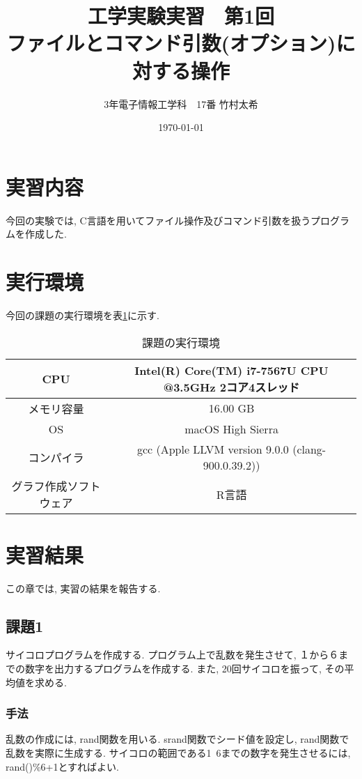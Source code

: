 \documentclass{jsarticle}
\title{工学実験実習　第1回\\ファイルとコマンド引数(オプション)に対する操作}
\author{3年電子情報工学科　17番 竹村太希}
\date{\today}
\begin{document}
    \maketitle
    \newpage{}

    \section{実習内容}
        今回の実験では, C言語を用いてファイル操作及びコマンド引数を扱うプログラムを作成した. 　　

    \section{実行環境}
        今回の課題の実行環境を表\ref{t-1}に示す. 
        \begin{table}[htbp]
            \centering
            \caption{課題の実行環境}
            \label{t-1}
            \begin{tabular}{|c||c|}
                \hline
                CPU & Intel(R) Core(TM) i7-7567U CPU @3.5GHz 2コア4スレッド \\
                \hline
                メモリ容量 & 16.00 GB \\
                \hline
                OS & macOS High Sierra \\
                \hline
                コンパイラ & gcc (Apple LLVM version 9.0.0 (clang-900.0.39.2)) \\
                \hline
                グラフ作成ソフトウェア & R言語 \\
                \hline
            \end{tabular}
        \end{table}
    
    \section{実習結果}
        この章では, 実習の結果を報告する. 
        \subsection{課題1}
            \label{kadai-1}
            サイコロプログラムを作成する. プログラム上で乱数を発生させて, １から６までの数字を出力するプログラムを作成する. 
            また, 20回サイコロを振って, その平均値を求める. 
            \subsubsection{手法}
                乱数の作成には, rand関数を用いる. 
                srand関数でシード値を設定し, rand関数で乱数を実際に生成する. 
                サイコロの範囲である1~6までの数字を発生させるには, rand()\%6+1とすればよい. 
                
\end{document}
